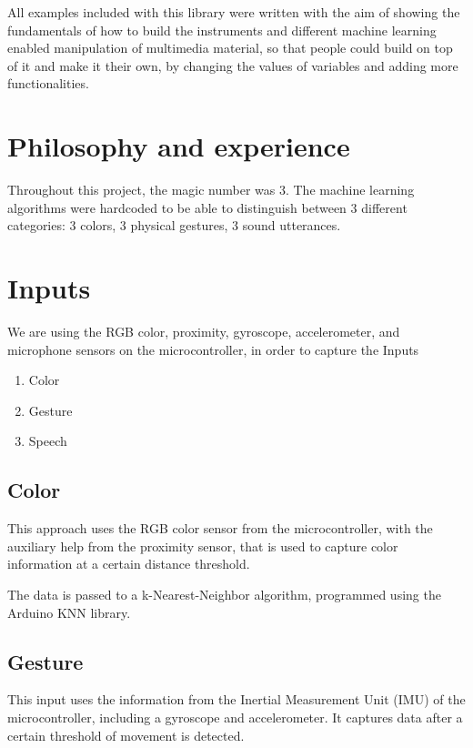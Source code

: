 All examples included with this library were written with the aim of showing the fundamentals of how to build the instruments and different machine learning enabled manipulation of multimedia material, so that people could build on top of it and make it their own, by changing the values of variables and adding more functionalities.

\section{Philosophy and experience}

Throughout this project, the magic number was 3. The machine learning algorithms were hardcoded to be able to distinguish between 3 different categories: 3 colors, 3 physical gestures, 3 sound utterances.

\section{Inputs}

We are using the RGB color, proximity, gyroscope, accelerometer, and microphone sensors on the microcontroller, in order to capture the Inputs

\begin{enumerate}
  \item Color
  \item Gesture
  \item Speech
\end{enumerate}

\subsection{Color}

This approach uses the RGB color sensor from the microcontroller, with the auxiliary help from the proximity sensor, that is used to capture color information at a certain distance threshold.

The data is passed to a k-Nearest-Neighbor algorithm, programmed using the Arduino KNN library.

\subsection{Gesture}

This input uses the information from the Inertial Measurement Unit (IMU) of the microcontroller, including a gyroscope and accelerometer. It captures data after a certain threshold of movement is detected.

